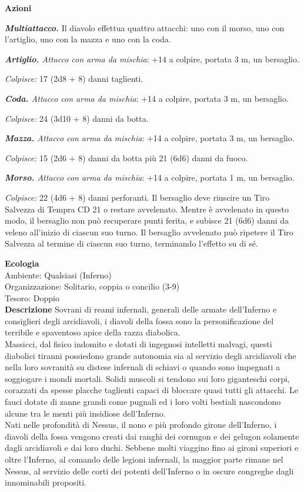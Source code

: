 \begin{multicols}{2}
\textbf{Azioni}

\emph{\textbf{Multiattacco.}} Il diavolo effettua quattro attacchi: uno con il morso, uno con l'artiglio, uno con la mazza e uno con la coda.

\emph{\textbf{Artiglio.} Attacco con arma da mischia}: +14 a colpire, portata 3 m, un bersaglio.

\emph{Colpisce:} 17 (2d8 + 8) danni taglienti.

\emph{\textbf{Coda.} Attacco con arma da mischia}: +14 a colpire, portata 3 m, un bersaglio.

\emph{Colpisce:} 24 (3d10 + 8) danni da botta.

\emph{\textbf{Mazza.} Attacco con arma da mischia}: +14 a colpire, portata 3 m, un bersaglio.

\emph{Colpisce:} 15 (2d6 + 8) danni da botta più 21 (6d6) danni da fuoco.

\emph{\textbf{Morso.} Attacco con arma da mischia}: +14 a colpire, portata 1 m, un bersaglio.

\emph{Colpisce:} 22 (4d6 + 8) danni perforanti. Il bersaglio deve riuscire un Tiro Salvezza di Tempra CD 21 o restare avvelenato. Mentre è avvelenato in questo modo, il bersaglio non può recuperare punti ferita, e subisce 21 (6d6) danni da veleno all'inizio di ciascun suo turno. Il bersaglio avvelenato può ripetere il Tiro Salvezza al termine di ciascun suo turno, terminando l'effetto su di sé.

\textbf{Ecologia}\\
Ambiente: Qualsiasi (Inferno)\\
Organizzazione: Solitario, coppia o concilio (3-9)\\
Tesoro: Doppio\\
\textbf{Descrizione}
Sovrani di reami infernali, generali delle armate dell'Inferno e consiglieri degli arcidiavoli, i diavoli della fossa sono la personificazione del terribile e spaventoso apice della razza diabolica.\\
Massicci, dal fisico indomito e dotati di ingegnosi intelletti malvagi, questi diabolici tiranni possiedono grande autonomia sia al servizio degli arcidiavoli che nella loro sovranità su distese infernali di schiavi o quando sono impegnati a soggiogare i mondi mortali. Solidi muscoli si tendono sui loro giganteschi corpi, corazzati da spesse placche taglienti capaci di bloccare quasi tutti gli attacchi. Le fauci dotate di zanne grandi come pugnali ed i loro volti bestiali nascondono alcune tra le menti più insidiose dell'Inferno.\\
Nati nelle profondità di Nessus, il nono e più profondo girone dell'Inferno, i diavoli della fossa vengono creati dai ranghi dei cornugon e dei gelugon solamente dagli arcidiavoli e dai loro duchi. Sebbene molti viaggino fino ai gironi superiori e oltre l'Inferno, al comando delle legioni infernali, la maggior parte rimane nel Nessus, al servizio delle corti dei potenti dell'Inferno o in oscure congreghe dagli innominabili propositi.\\


\end{multicols}
